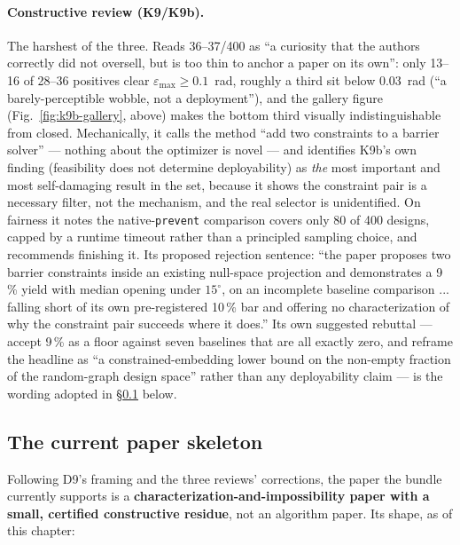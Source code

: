\documentclass[10pt,a4paper]{article}
\newcommand{\fn}[1]{\nolinkurl{#1}}
\begin{document}
\paragraph{Constructive review (K9/K9b).} The harshest of the three. Reads 36--37/400 as
``a curiosity that the authors correctly did not oversell, but is too thin to anchor a paper on
its own'': only 13--16 of 28--36 positives clear $\varepsilon_{\max}\ge0.1$~rad, roughly a third
sit below 0.03~rad (``a barely-perceptible wobble, not a deployment''), and the gallery figure
(Fig.~\ref{fig:k9b-gallery}, above) makes the bottom third visually indistinguishable from
closed. Mechanically, it calls the method ``add two constraints to a barrier solver'' --- nothing
about the optimizer is novel --- and identifies K9b's own finding (feasibility does not determine
deployability) as \emph{the} most important and most self-damaging result in the set, because it
shows the constraint pair is a necessary filter, not the mechanism, and the real selector is
unidentified. On fairness it notes the native-\fn{prevent} comparison covers only 80 of 400
designs, capped by a runtime timeout rather than a principled sampling choice, and recommends
finishing it. Its proposed rejection sentence: ``the paper proposes two barrier constraints inside
an existing null-space projection and demonstrates a 9\,\% yield with median opening under
$15^\circ$, on an incomplete baseline comparison ... falling short of its own pre-registered
10\,\% bar and offering no characterization of why the constraint pair succeeds where it does.''
Its own suggested rebuttal --- accept 9\,\% as a floor against seven baselines that are all exactly
zero, and reframe the headline as ``a constrained-embedding lower bound on the non-empty fraction
of the random-graph design space'' rather than any deployability claim --- is the wording adopted
in \S\ref{sec:day3-paper} below.

\subsection{The current paper skeleton}
\label{sec:day3-paper}

Following D9's framing and the three reviews' corrections, the paper the bundle currently supports
is a \textbf{characterization-and-impossibility paper with a small, certified constructive
residue}, not an algorithm paper. Its shape, as of this chapter:
\end{document}
